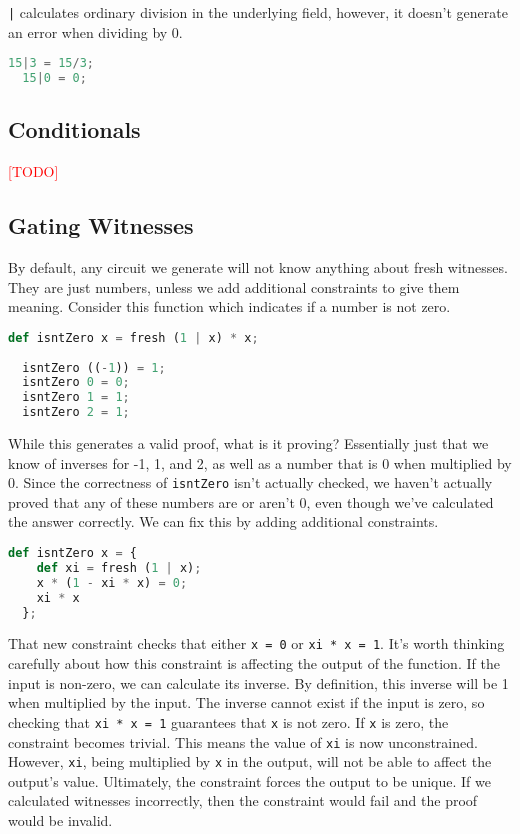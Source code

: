 \lstinline{|} calculates ordinary division in the underlying field, however, it doesn't generate an error when dividing by 0.

\begin{lstlisting}[language=Python]
  15|3 = 15/3;
  15|0 = 0;
\end{lstlisting}










\subsection{Conditionals}

\textcolor{red}{[TODO]}






\subsection{Gating Witnesses} \label{GW}

By default, any circuit we generate will not know anything about fresh witnesses. They are just numbers, unless we add additional constraints to give them meaning. Consider this function which indicates if a number is not zero.

\begin{lstlisting}[language=Python]
  def isntZero x = fresh (1 | x) * x;
  
  isntZero ((-1)) = 1;
  isntZero 0 = 0;
  isntZero 1 = 1;
  isntZero 2 = 1;
\end{lstlisting}

While this generates a valid proof, what is it proving? Essentially just that we know of inverses for -1, 1, and 2, as well as a number that is 0 when multiplied by 0. Since the correctness of \lstinline{isntZero} isn't actually checked, we haven't actually proved that any of these numbers are or aren't 0, even though we've calculated the answer correctly. We can fix this by adding additional constraints.

\begin{lstlisting}[language=Python]
  def isntZero x = {
    def xi = fresh (1 | x);
    x * (1 - xi * x) = 0;
    xi * x
  };
\end{lstlisting}

That new constraint checks that either \lstinline{x = 0} or \lstinline{xi * x = 1}. It's worth thinking carefully about how this constraint is affecting the output of the function. If the input is non-zero, we can calculate its inverse. By definition, this inverse will be 1 when multiplied by the input. The inverse cannot exist if the input is zero, so checking that \lstinline{xi * x = 1} guarantees that \lstinline{x} is not zero. If \lstinline{x} is zero, the constraint becomes trivial. This means the value of \lstinline{xi} is now unconstrained. However, \lstinline{xi}, being multiplied by \lstinline{x} in the output, will not be able to affect the output's value. Ultimately, the constraint forces the output to be unique. If we calculated witnesses incorrectly, then the constraint would fail and the proof would be invalid.

